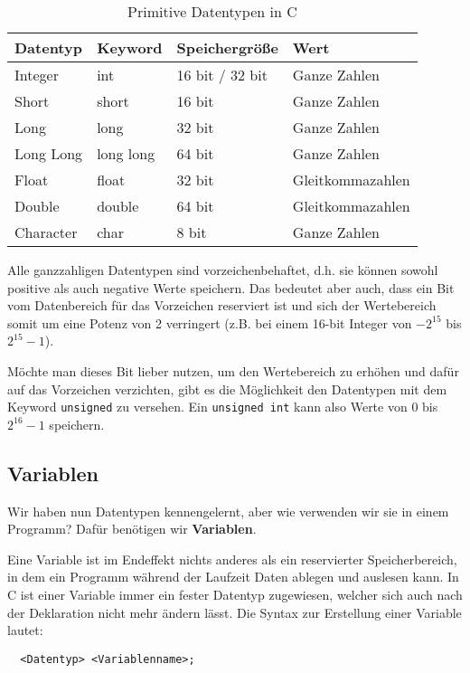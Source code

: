 \documentclass[11pt]{article}
\begin{document}
\begin{table}[h!]
  \centering
  \begin{tabular}{@{}llll@{}}
    \toprule
    Datentyp  & Keyword   & Speichergröße   & Wert             \\ \midrule
    Integer   & int       & 16 bit / 32 bit & Ganze Zahlen     \\
    Short     & short     & 16 bit          & Ganze Zahlen     \\
    Long      & long      & 32 bit          & Ganze Zahlen     \\
    Long Long & long long & 64 bit          & Ganze Zahlen     \\
    Float     & float     & 32 bit          & Gleitkommazahlen \\
    Double    & double    & 64 bit          & Gleitkommazahlen \\
    Character & char      & 8 bit           & Ganze Zahlen     \\ \bottomrule
  \end{tabular}
  \caption{Primitive Datentypen in C}
  \label{tbl:datentypen}
\end{table}

\begin{anmk}
  Alle ganzzahligen Datentypen sind vorzeichenbehaftet, d.h. sie können sowohl positive als auch negative Werte speichern.
  Das bedeutet aber auch, dass ein Bit vom Datenbereich für das Vorzeichen reserviert ist und sich der Wertebereich
  somit um eine Potenz von 2 verringert (z.B. bei einem 16-bit Integer von $-2^{15}$ bis $2^{15}-1$).

  Möchte man dieses Bit lieber nutzen, um den Wertebereich zu erhöhen und dafür auf das Vorzeichen verzichten, gibt es
  die Möglichkeit den Datentypen mit dem Keyword \texttt{unsigned} zu versehen. Ein \texttt{unsigned int} kann also
  Werte von $0$ bis $2^{16}-1$ speichern.
\end{anmk}

\subsection{Variablen}
Wir haben nun Datentypen kennengelernt, aber wie verwenden wir sie in einem Programm? Dafür benötigen wir \textbf{Variablen}.

Eine Variable ist im Endeffekt nichts anderes als ein reservierter Speicherbereich, in dem ein Programm während der
Laufzeit Daten ablegen und auslesen kann. In C ist einer Variable immer ein fester Datentyp zugewiesen, welcher sich
auch nach der Deklaration nicht mehr ändern lässt. Die Syntax zur Erstellung einer Variable lautet:
\begin{verbatim}
  <Datentyp> <Variablenname>;
\end{verbatim}
\end{document}
